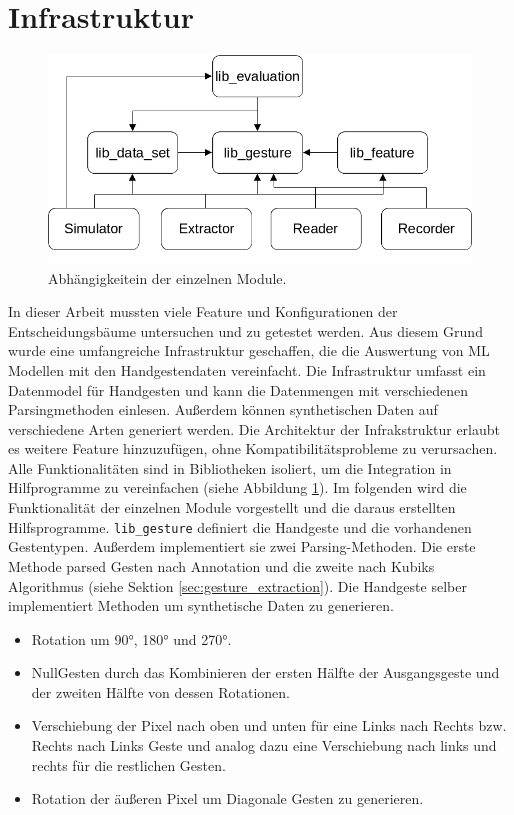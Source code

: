 \section{Infrastruktur}
\label{sec:recorder}
\begin{figure}
    \centering
    \includegraphics[width=0.75\linewidth]{images/architecture_overview.jpg}
    \caption{Abhängigkeitein der einzelnen Module.}
    \label{fig:architecture_overview}
\end{figure}
In dieser Arbeit mussten viele Feature und Konfigurationen der Entscheidungsbäume untersuchen und zu getestet werden. Aus diesem Grund wurde eine umfangreiche Infrastruktur geschaffen, die die
Auswertung von ML Modellen mit den Handgestendaten vereinfacht. Die Infrastruktur umfasst ein Datenmodel für Handgesten und kann die Datenmengen mit verschiedenen Parsingmethoden einlesen.
\newline
\newline
Außerdem können synthetischen Daten auf verschiedene Arten generiert werden. Die Architektur der Infrakstruktur erlaubt es weitere Feature hinzuzufügen, ohne Kompatibilitätsprobleme zu verursachen.
Alle Funktionalitäten sind in Bibliotheken isoliert, um die Integration in Hilfprogramme zu vereinfachen (siehe Abbildung \ref{fig:architecture_overview}).
\newline
\newline
Im folgenden wird die Funktionalität der einzelnen Module vorgestellt und die daraus erstellten Hilfsprogramme.
\newline
\newline
\texttt{lib\_gesture} definiert die Handgeste und die vorhandenen Gestentypen. Außerdem implementiert sie zwei Parsing-Methoden. Die erste Methode parsed Gesten nach Annotation und die
zweite nach Kubiks Algorithmus (siehe Sektion \ref{sec:gesture_extraction}). Die Handgeste selber implementiert Methoden um synthetische Daten zu generieren.
\begin{itemize}
    \item Rotation um 90°, 180° und 270°.
    \item NullGesten durch das Kombinieren der ersten Hälfte der Ausgangsgeste und der zweiten Hälfte von dessen Rotationen.
    \item Verschiebung der Pixel nach oben und unten für eine Links nach Rechts bzw. Rechts nach Links Geste und analog dazu eine Verschiebung nach links und rechts für die restlichen Gesten.
    \item Rotation der äußeren Pixel um Diagonale Gesten zu generieren.
\end{itemize}
